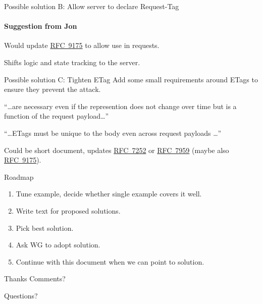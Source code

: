 \documentclass[aspectratio=169,colorlinks]{beamer}
\newcommand{\rfc}[1]{\href{https://datatracker.ietf.org/doc/html/rfc#1}{RFC~#1}}
\begin{document}
\begin{frame}{Possible solution B: Allow server to declare Request-Tag}\large
	\framesubtitle{Suggestion from Jon}

	Would update \rfc{9175} to allow use in requests.

	Shifts logic and state tracking to the server.
\end{frame}

\begin{frame}{Possible solution C: Tighten ETag}\large
	Add some small requirements around ETags
	to ensure they prevent the attack.

	\bigskip

	``\ldots are necessary even if the represention does not change over time but is a function of the request payload\ldots''

	``\ldots ETags must be unique to the body even across request payloads \ldots''

	\bigskip

	Could be short document, updates \rfc{7252} or \rfc{7959} (maybe also \rfc{9175}).
\end{frame}

\begin{frame}{Roadmap}\Large
	\begin{enumerate}
		\item Tune example, decide whether single example covers it well.
		\item Write text for proposed solutions.
		\item Pick best solution.
		\item Ask WG to adopt solution.
		\item Continue with this document when we can point to solution.
	\end{enumerate}
\end{frame}

\begin{frame}{Thanks}\Large
	Comments?

	\bigskip

	Questions?
\end{frame}
\end{document}
